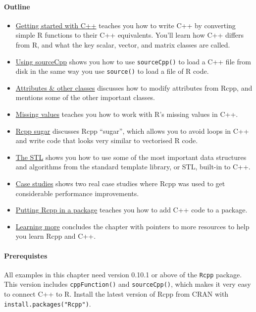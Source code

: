 \paragraph{Outline}

\begin{itemize}
\item
  \hyperref[rcpp-intro]{Getting started with C++} teaches you how to
  write C++ by converting simple R functions to their C++ equivalents.
  You'll learn how C++ differs from R, and what the key scalar, vector,
  and matrix classes are called.
\item
  \hyperref[sourceCpp]{Using sourceCpp} shows you how to use
  \texttt{sourceCpp()} to load a C++ file from disk in the same way you
  use \texttt{source()} to load a file of R code.
\item
  \hyperref[rcpp-classes]{Attributes \& other classes} discusses how to
  modify attributes from Rcpp, and mentions some of the other important
  classes.
\item
  \hyperref[rcpp-na]{Missing values} teaches you how to work with R's
  missing values in C++.
\item
  \hyperref[rcpp-sugar]{Rcpp sugar} discusses Rcpp ``sugar'', which
  allows you to avoid loops in C++ and write code that looks very
  similar to vectorised R code.
\item
  \hyperref[stl]{The STL} shows you how to use some of the most
  important data structures and algorithms from the standard template
  library, or STL, built-in to C++.
\item
  \hyperref[rcpp-case-studies]{Case studies} shows two real case studies
  where Rcpp was used to get considerable performance improvements.
\item
  \hyperref[rcpp-package]{Putting Rcpp in a package} teaches you how to
  add C++ code to a package.
\item
  \hyperref[rcpp-more]{Learning more} concludes the chapter with
  pointers to more resources to help you learn Rcpp and C++.
\end{itemize}

\paragraph{Prerequistes}

All examples in this chapter need version 0.10.1 or above of the
\texttt{Rcpp} package. This version includes \texttt{cppFunction()} and
\texttt{sourceCpp()}, which makes it very easy to connect C++ to R.
Install the latest version of Rcpp from CRAN with
\texttt{install.packages("Rcpp")}.

